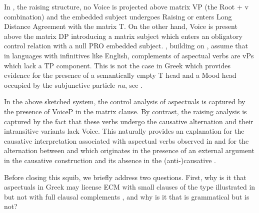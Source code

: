 \documentclass[output=paper]{langscibook}
\begin{document}
In , the raising structure, no Voice is projected above matrix VP (the Root + v combination) 
and the embedded subject undergoes Raising or enters Long Distance Agreement with the matrix T. 
On the other hand, Voice is present above the matrix DP introducing a matrix subject which enters an obligatory control relation with a null PRO embedded subject. 
\citet{MourounasWilliamson2019}, building on \citet{wurmbrand2001,Wurmbrand2002,Wurmbrand2014}, assume that in languages with infinitives like English, complements of aspectual verbs are vPs which lack a TP component. 
This is not the case in Greek which provides evidence for the presence of a semantically empty T head 
and a Mood head occupied by the subjunctive particle \textit{na}, see \citet{AlexiadouAnagnostopoulouToapp}. 

In the above sketched system, the control analysis of aspectuals is captured by the presence of VoiceP in the matrix clause. 
By contrast, the raising analysis is captured by the fact that these verbs undergo the causative alternation and their intransitive variants lack Voice. 
This naturally provides an explanation for the causative interpretation associated with aspectual verbs observed in  
and for the alternation between  and  
which originates in the presence of an external argument in the causative construction  
and its absence in the (anti-)causative . 

Before closing this squib, we briefly address two questions. 
First, why is it that aspectuals in Greek may license ECM with small clauses of the type illustrated in  
but not with full clausal complements , and why is it that  is grammatical but  is not?

\ea%
    \label{alexiadouex:key:19}
    \z
\z 
\end{document}
